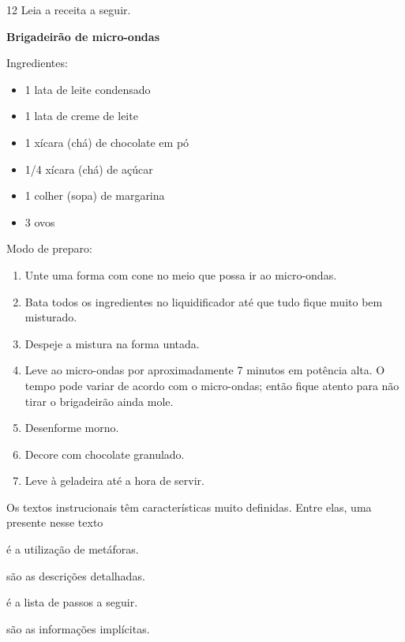 \num{12} Leia a receita a seguir.

\begin{myquote}
\textbf{Brigadeirão de micro-ondas}

Ingredientes:

\begin{itemize}
\item
  1 lata de leite condensado
\item
  1 lata de creme de leite
\item
  1 xícara (chá) de chocolate em pó
\item
  1/4 xícara (chá) de açúcar
\item
  1 colher (sopa) de margarina
\item
  3 ovos
\end{itemize}

Modo de preparo:

\begin{enumerate}
\item
  Unte uma forma com cone no meio que possa ir ao micro-ondas.
\item
  Bata todos os ingredientes no liquidificador até que tudo fique muito
  bem misturado.
\item
  Despeje a mistura na forma untada.
\item
  Leve ao micro-ondas por aproximadamente 7 minutos em potência alta. O
  tempo pode variar de acordo com o micro-ondas; então fique atento para
  não tirar o brigadeirão ainda mole.
\item
  Desenforme morno.
\item
  Decore com chocolate granulado.
\item
  Leve à geladeira até a hora de servir.
\end{enumerate}

\end{myquote}

Os textos instrucionais têm características muito definidas. Entre elas,
uma presente nesse texto

\begin{escolha}
\item é a utilização de metáforas.

\item são as descrições detalhadas.

\item é a lista de passos a seguir.

\item são as informações implícitas.
\end{escolha}

